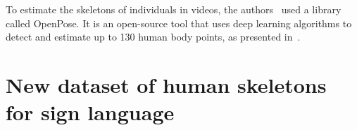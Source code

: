 


To estimate the skeletons of individuals in videos, the authors~\cite{st-gcn-2018} used a library called OpenPose. It is an open-source tool that uses deep learning algorithms to detect and estimate up to 130 human body points, as presented in~\cite{cao-realtime-2017,simon-hand-2017,wei-cpm-2016}. \\[-8mm]



\section{New dataset of human skeletons for sign language} 
\label{sec:new-dataset}

